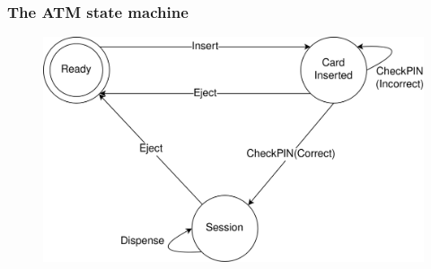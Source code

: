 \documentclass[compress,handout]{beamer}
\begin{document}
\begin{frame}
  \frametitle{The ATM state machine}

  \begin{figure}
    \centering
    \includegraphics[alt={A state diagram of an ATM, with circles for each state: Ready, CardInserted, and Session; labelled arrows between the states; with the labels containing the transition names: Insert, Dispense, CheckPIN(Correct), CheckPIN(Incorrect), and Eject.},width=0.8\framewidth]{ATM.png}
  \end{figure}
  \vspace*{-1cm}

\end{frame}
\end{document}
